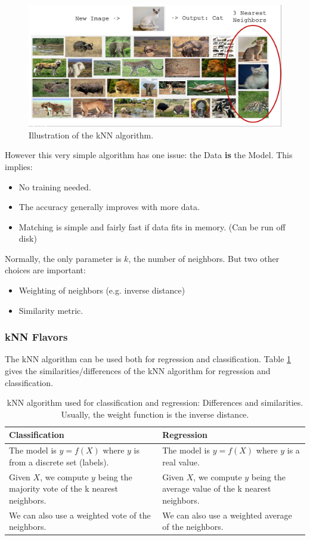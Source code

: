 \begin{figure}[H] %
\centerline{
\includegraphics[width=13cm]{img/07/knn}
}
\caption{\label{fig:knn} 
Illustration of the kNN algorithm.
}
\end{figure}
\newpage
However this very simple algorithm has one issue: the Data {\bf is} the Model. This implies:
\begin{itemize}
 \item No training needed.
 \item The accuracy generally improves with more data.
 \item Matching is simple and fairly fast if data fits in memory. (Can be run off disk)
\end{itemize}
Normally, the only parameter is $k$, the number of neighbors. But two other choices are important:
\begin{itemize}
 \item Weighting of neighbors (e.g. inverse distance)
 \item Similarity metric.
\end{itemize}

\subsubsection{kNN Flavors}
The kNN algorithm can be used both for regression and classification. Table \ref{tab:knn} gives the similarities/differences of the kNN algorithm for regression and classification.
\begin{table}[h!]
 \centering
 \begin{tabular}{p{7cm}|p{7cm}}
  Classification & Regression \\ \hline \hline
  The model is $y=f(X)$ where $y$ is from a discrete set (labels). & The model is $y=f(X)$ where $y$ is a real value. \\ \hline
  Given $X$, we compute $y$ being the majority vote of the k nearest neighbors. & Given $X$, we compute $y$ being the average value of the k nearest neighbors. \\ \hline
  We can also use a weighted vote of the neighbors. & We can also use a weighted average of the neighbors.
 \end{tabular}
 \label{tab:knn}
 \caption{kNN algorithm used for classification and regression: Differences and similarities. Usually, the weight function is the inverse distance. 
}
\end{table}

